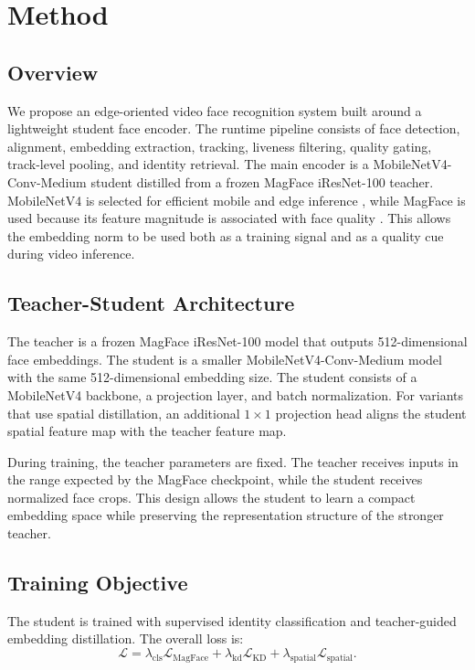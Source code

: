 \section{Method}

\subsection{Overview}

We propose an edge-oriented video face recognition system built around a lightweight student face encoder. The runtime pipeline consists of face detection, alignment, embedding extraction, tracking, liveness filtering, quality gating, track-level pooling, and identity retrieval. The main encoder is a MobileNetV4-Conv-Medium student distilled from a frozen MagFace iResNet-100 teacher. MobileNetV4 is selected for efficient mobile and edge inference \cite{mobilenetv4}, while MagFace is used because its feature magnitude is associated with face quality \cite{magface}. This allows the embedding norm to be used both as a training signal and as a quality cue during video inference.

\subsection{Teacher-Student Architecture}

The teacher is a frozen MagFace iResNet-100 model that outputs 512-dimensional face embeddings. The student is a smaller MobileNetV4-Conv-Medium model with the same 512-dimensional embedding size. The student consists of a MobileNetV4 backbone, a projection layer, and batch normalization. For variants that use spatial distillation, an additional $1 \times 1$ projection head aligns the student spatial feature map with the teacher feature map.

During training, the teacher parameters are fixed. The teacher receives inputs in the range expected by the MagFace checkpoint, while the student receives normalized face crops. This design allows the student to learn a compact embedding space while preserving the representation structure of the stronger teacher.

\subsection{Training Objective}

The student is trained with supervised identity classification and teacher-guided embedding distillation. The overall loss is:
\begin{equation}
    \mathcal{L}
    =
    \lambda_{\mathrm{cls}}\mathcal{L}_{\mathrm{MagFace}}
    +
    \lambda_{\mathrm{kd}}\mathcal{L}_{\mathrm{KD}}
    +
    \lambda_{\mathrm{spatial}}\mathcal{L}_{\mathrm{spatial}} .
\end{equation}

